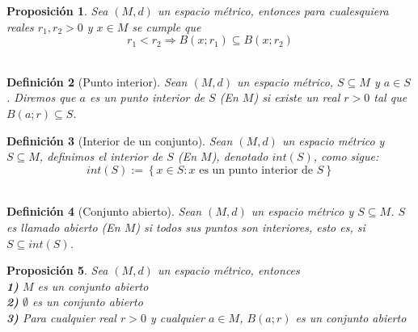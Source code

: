 \documentclass[oneside]{book} %
\theoremstyle{Teorema}
\newtheorem{Definicion}{Definición}[chapter]
\newtheorem{Proposicion}[Definicion]{Proposición}
\theoremstyle{Ejemplos}
\theoremstyle{[Obs]}
\renewcommand{\{}{\left\lbrace} %
\renewcommand{\}}{\right\rbrace} %
\renewcommand{\sc}{\subseteq} %
\begin{document}
			\begin{Proposicion}
				
				Sea $(M, d)$ un espacio métrico, entonces para cualesquiera reales $r_1, r_2 > 0$ y $x \in M$ se cumple que \\
				
				\[ r_1 < r_2 \Rightarrow B(x;r_1) \sc B(x;r_2) \] \\

			\end{Proposicion}

			\begin{Definicion}[Punto interior]

				Sean $(M, d)$ un espacio métrico, $S \sc M$ y $a \in S$. Diremos que $a$ es un punto interior de $S$ (En $M$) si existe un real $r > 0$ tal que $B(a;r) \sc S$. \\

			\end{Definicion}

			\begin{Definicion}[Interior de un conjunto]

				Sean $(M, d)$ un espacio métrico y $S \sc M$, definimos el interior de $S$ (En $M$), denotado $int(S)$, como sigue: \\

				\[ int(S) := \{ x \in S : x \text{ es un punto interior de } S \} \] \\

			\end{Definicion}

			\begin{Definicion}[Conjunto abierto]

				Sean $(M, d)$ un espacio métrico y $S \sc M$. $S$ es llamado abierto (En $M$) si todos sus puntos son interiores, esto es, si $S \sc int(S)$. \\

			\end{Definicion}

			\begin{Proposicion}
				
				Sea $(M, d)$ un espacio métrico, entonces \\

				\textbf{1)} $M$ es un conjunto abierto \\

				\textbf{2)} $\emptyset$ es un conjunto abierto \\

				\textbf{3)} Para cualquier real $r > 0$ y cualquier $a \in M$, $B(a;r)$ es un conjunto abierto \\

			\end{Proposicion}
\end{document}
